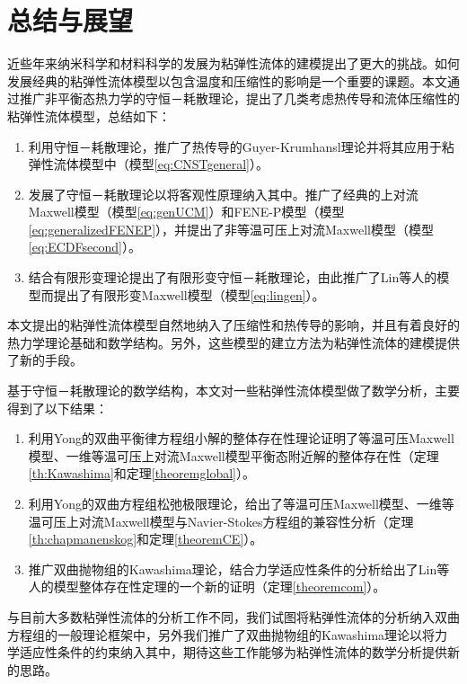 \chapter{总结与展望}

% 
近些年来纳米科学和材料科学的发展为粘弹性流体的建模提出了更大的挑战。如何发展经典的粘弹性流体模型以包含温度和压缩性的影响是一个重要的课题。本文通过推广非平衡态热力学的守恒－耗散理论，提出了几类考虑热传导和流体压缩性的粘弹性流体模型，总结如下：
\begin{enumerate}
	\item 利用守恒－耗散理论，推广了热传导的Guyer-Krumhansl理论并将其应用于粘弹性流体模型中（模型\eqref{eq:CNSTgeneral}）。
	\item 发展了守恒－耗散理论以将客观性原理纳入其中。推广了经典的上对流Maxwell模型（模型\eqref{eq:genUCM}）和FENE-P模型（模型\eqref{eq:generalizedFENEP}），并提出了非等温可压上对流Maxwell模型（模型\eqref{eq:ECDFsecond}）。
	\item 结合有限形变理论提出了有限形变守恒－耗散理论，由此推广了Lin等人的模型而提出了有限形变Maxwell模型（模型\eqref{eq:lingen}）。
\end{enumerate}
本文提出的粘弹性流体模型自然地纳入了压缩性和热传导的影响，并且有着良好的热力学理论基础和数学结构。另外，这些模型的建立方法为粘弹性流体的建模提供了新的手段。

基于守恒－耗散理论的数学结构，本文对一些粘弹性流体模型做了数学分析，主要得到了以下结果：
\begin{enumerate}
	\item 利用Yong的双曲平衡律方程组小解的整体存在性理论证明了等温可压Maxwell模型、一维等温可压上对流Maxwell模型平衡态附近解的整体存在性（定理\ref{th:Kawashima}和定理\ref{theoremglobal}）。
	\item 利用Yong的双曲方程组松弛极限理论，给出了等温可压Maxwell模型、一维等温可压上对流Maxwell模型与Navier-Stokes方程组的兼容性分析（定理\ref{th:chapmanenskog}和定理\ref{theoremCE}）。
	\item 推广双曲抛物组的Kawashima理论，结合力学适应性条件的分析给出了Lin等人的模型整体存在性定理的一个新的证明（定理\ref{theoremcom}）。
\end{enumerate}
与目前大多数粘弹性流体的分析工作不同，我们试图将粘弹性流体的分析纳入双曲方程组的一般理论框架中，另外我们推广了双曲抛物组的Kawashima理论以将力学适应性条件的约束纳入其中，期待这些工作能够为粘弹性流体的数学分析提供新的思路。


